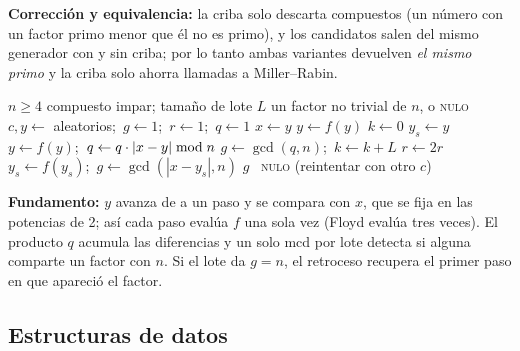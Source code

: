 \noindent\textbf{Corrección y equivalencia:} la criba solo descarta compuestos
(un número con un factor primo menor que él no es primo), y los candidatos salen
del mismo generador con y sin criba; por lo tanto ambas variantes devuelven
\emph{el mismo primo} y la criba solo ahorra llamadas a Miller--Rabin.

\begin{algorithm}[H]
\caption{\textsc{Brent}$(n, \mathit{rng}, L = 128)$ \hfill Pollard Rho con detección de Brent}
\label{alg:brent}
\begin{algorithmic}[1]
\Require $n \ge 4$ compuesto impar; tamaño de lote $L$
\Ensure un factor no trivial de $n$, o \textsc{nulo}
\State $c, y \gets$ aleatorios;\ $g \gets 1$;\ $r \gets 1$;\ $q \gets 1$
  \State $x \gets y$
   \State $y \gets f(y)$ \EndFor {}
  \State $k \gets 0$
    \State $y_s \gets y$
     \State $y \gets f(y)$;\ $q \gets q \cdot |x - y| \bmod n$ \EndFor
    \State $g \gets \gcd(q, n)$;\ $k \gets k + L$
  \EndWhile
  \State $r \gets 2r$
\EndWhile
{} 
  \Repeat \State $y_s \gets f(y_s)$;\ $g \gets \gcd(|x - y_s|, n)$ 
\EndIf
{} \Return $g$ \Else \ \Return \textsc{nulo} (reintentar con otro $c$) \EndIf
\end{algorithmic}
\end{algorithm}

\noindent\textbf{Fundamento:} $y$ avanza de a un paso y se compara con $x$, que
se fija en las potencias de 2; así cada paso evalúa $f$ una sola vez (Floyd
evalúa tres veces). El producto $q$ acumula las diferencias y un solo mcd por
lote detecta si alguna comparte un factor con $n$. Si el lote da $g = n$, el
retroceso recupera el primer paso en que apareció el factor.

\subsection{Estructuras de datos}

